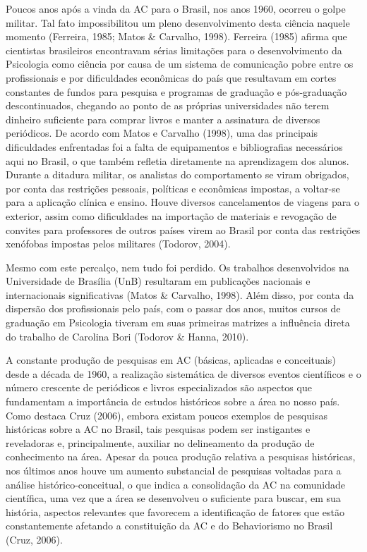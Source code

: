 Poucos anos após a vinda da AC para o Brasil, nos anos 1960, ocorreu o golpe militar. Tal fato impossibilitou um pleno desenvolvimento desta ciência naquele momento (Ferreira, 1985; Matos \& Carvalho, 1998). Ferreira (1985) afirma que cientistas brasileiros encontravam sérias limitações para o desenvolvimento da Psicologia como ciência por causa de um sistema de comunicação pobre entre os profissionais e por dificuldades econômicas do país que resultavam em cortes constantes de fundos para pesquisa e programas de graduação e pós-graduação descontinuados, chegando ao ponto de as próprias universidades não terem dinheiro suficiente para comprar livros e manter a assinatura de diversos periódicos. De acordo com Matos e Carvalho (1998), uma das principais dificuldades enfrentadas foi a falta de equipamentos e bibliografias necessários aqui no Brasil, o que também refletia diretamente na aprendizagem dos alunos. Durante a ditadura militar, os analistas do comportamento se viram obrigados, por conta das restrições pessoais, políticas e econômicas impostas, a voltar-se para a aplicação clínica e ensino. Houve diversos cancelamentos de viagens para o exterior, assim como dificuldades na importação de materiais e revogação de convites para professores de outros países virem ao Brasil por conta das restrições xenófobas impostas pelos militares (Todorov, 2004). 

Mesmo com este percalço, nem tudo foi perdido. Os trabalhos desenvolvidos na Universidade de Brasília (UnB) resultaram em publicações nacionais e internacionais significativas (Matos \& Carvalho, 1998). Além disso, por conta da dispersão dos profissionais pelo país, com o passar dos anos, muitos cursos de graduação em Psicologia tiveram em suas primeiras matrizes a influência direta do trabalho de Carolina Bori (Todorov \& Hanna, 2010). 

A constante produção de pesquisas em AC (básicas, aplicadas e conceituais) desde a década de 1960, a realização sistemática de diversos eventos científicos e o número crescente de periódicos e livros especializados são aspectos que fundamentam a importância de estudos históricos sobre a área no nosso país. Como destaca Cruz (2006), embora existam poucos exemplos de pesquisas históricas sobre a AC no Brasil, tais pesquisas podem ser instigantes e reveladoras e, principalmente, auxiliar no delineamento da produção de conhecimento na área. Apesar da pouca produção relativa a pesquisas históricas, nos últimos anos houve um aumento substancial de pesquisas voltadas para a análise histórico-conceitual, o que indica a consolidação da AC na comunidade científica, uma vez que a área se desenvolveu o suficiente para buscar, em sua história, aspectos relevantes que favorecem a identificação de fatores que estão constantemente afetando a constituição da AC e do Behaviorismo no Brasil (Cruz, 2006). 

